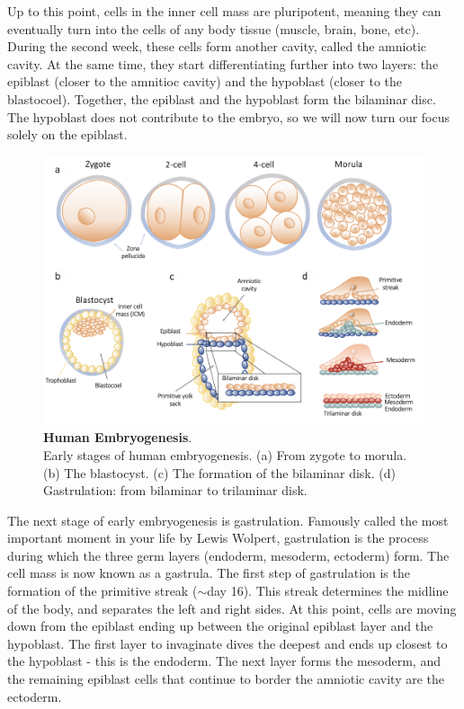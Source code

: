 Up to this point, cells in the inner cell mass are pluripotent, meaning they can eventually turn into the cells of any body tissue (muscle, brain, bone, etc). 
During the second week, these cells form another cavity, called the amniotic cavity. 
At the same time, they start differentiating further into two layers: the epiblast (closer to the amnitioc cavity) and the hypoblast (closer to the blastocoel). 
Together, the epiblast and the hypoblast form the bilaminar disc.
The hypoblast does not contribute to the embryo, so we will now turn our focus solely on the epiblast.\\

\begin{figure}[h]
\centering
\includegraphics[width=14.5cm]{Chapter1/Fig/embryogenesis_til_gastrulation.png}
\caption[Human Embryogenesis]{\textbf{Human Embryogenesis}.\\
Early stages of human embryogenesis.
(a) From zygote to morula.
(b) The blastocyst.
(c) The formation of the bilaminar disk.
(d) Gastrulation: from bilaminar to trilaminar disk.}
\label{fig:embryogenesis}
\end{figure}

The next stage of early embryogenesis is gastrulation.
Famously called the most important moment in your life by Lewis Wolpert, gastrulation is the process during which the three germ layers (endoderm, mesoderm, ectoderm) form.
The cell mass is now known as a gastrula.
The first step of gastrulation is the formation of the primitive streak ($\sim$day 16).
This streak determines the midline of the body, and separates the left and right sides.
At this point, cells are moving down from the epiblast ending up between the original epiblast layer and the hypoblast.
The first layer to invaginate dives the deepest and ends up closest to the hypoblast - this is the endoderm.
The next layer forms the mesoderm, and the remaining epiblast cells that continue to border the amniotic cavity are the ectoderm.\\

